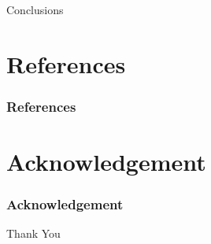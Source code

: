 \documentclass{beamer}
\begin{document}
\begin{frame}{Conclusions}
\end{frame}



\section{References}
\begin{frame}[allowframebreaks]
\frametitle{References}
 \nocite{*}
 

\end{frame}

\section{Acknowledgement}
\begin{frame} [allowframebreaks]
\frametitle{Acknowledgement}
\lipsum[1]


\end{frame}

\begin{frame}
\Huge{\centerline{Thank You}}
\end{frame}

\end{document}
